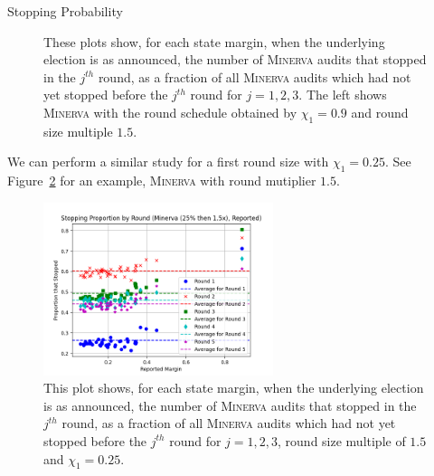 \documentclass[final]{beamer}
\newcommand{\Minerva}{\textsc{Minerva}\xspace}
\newlength{\colwidth}
\begin{document}
\begin{frame}[t]
\begin{columns}[t]
\begin{column}{\colwidth}
\begin{block}{Stopping Probability}
\begin{figure}[h]
\begin{minipage}{.49\textwidth}
\begin{centering}
\label{fig:minerva1p5_sprob}
\end{centering}
\end{minipage}
\caption{These plots show, for each state margin, when the underlying election is as announced, the number of \Minerva audits that stopped in the $j^{th}$ round, as a fraction of all \Minerva audits which had not yet stopped before the $j^{th}$ round for $j=1,2,3$. The left shows \Minerva with the round schedule obtained by $\chi_1=0.9$ and round size multiple $1.5$.}
\end{figure}

We can perform a similar study for a first round size with $\chi_1=0.25$. 
See Figure~\ref{fig:minerva_25} for an example, \Minerva with round mutiplier $1.5$. 

\begin{figure}
\begin{centering}
\includegraphics[width=0.6\textwidth]{minerva25percthen1p5_sprob.png}
\caption{This plot shows, for each state margin, when the underlying election is as announced, the number of \Minerva audits that stopped in the $j^{th}$ round,
as a fraction of all \Minerva audits which had not yet stopped before the $j^{th}$ round for $j=1,2,3$, round size multiple of $1.5$ and $\chi_1 = 0.25$.}
\label{fig:minerva_25}
\end{centering}
\end{figure}

  \end{block}


\end{column}
\end{columns}
\end{frame}
\end{document}
